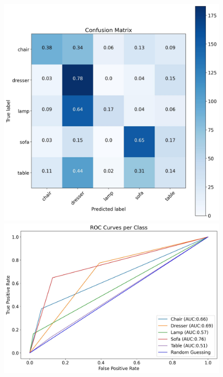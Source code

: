 \documentclass[11pt,a4paper]{article}
\begin{document}
\begin{figure}[H]
{{    \includegraphics[scale=0.13]{imgs/experiments/images/9-1/Experiment-9-1-TESTING-confusion-matrix.jpg}
    \includegraphics[scale=0.13]{imgs/experiments/images/9-1/Experiment-9-1-TESTING-ROC.jpg}
    }}
    \qquad
\end{figure}
\end{document}
